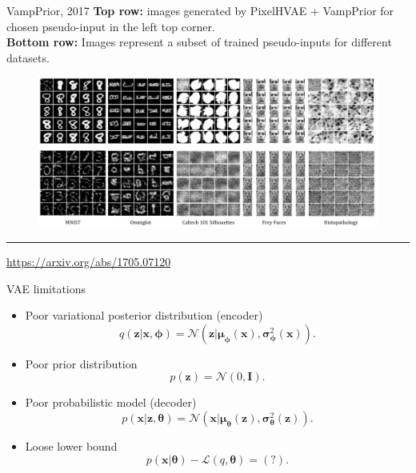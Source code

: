 \documentclass{beamer}
\newcommand{\bx}{\mathbf{x}}
\newcommand{\bz}{\mathbf{z}}
\newcommand{\bmu}{\boldsymbol{\mu}}
\newcommand{\bsigma}{\boldsymbol{\sigma}}
\newcommand{\btheta}{\boldsymbol{\theta}}
\newcommand{\bphi}{\boldsymbol{\phi}}
\begin{document}
\begin{frame}{VampPrior, 2017}
	\vspace{0.1cm}
	\textbf{Top row:} images generated by PixelHVAE + VampPrior for chosen pseudo-input in the left top corner. \\
	\vspace{0.1cm}
	\textbf{Bottom row:} Images represent a subset of trained pseudo-inputs for different datasets.
	\begin{figure}[h]
		\centering
		\includegraphics[width=1.0\linewidth]{figs/VampPrior_4.png}
	\end{figure}
	\vfill
	\hrule\medskip
	{\scriptsize \href{https://arxiv.org/abs/1705.07120}{https://arxiv.org/abs/1705.07120}}
\end{frame}
\begin{frame}{VAE limitations}
\begin{itemize}
	\item Poor variational posterior distribution (encoder)
	\[
	q(\bz | \bx, \bphi) = \mathcal{N}(\bz| \bmu_{\bphi}(\bx), \bsigma^2_{\bphi}(\bx)).
	\]
	\item Poor prior distribution
	\[
	p(\bz) = \mathcal{N}(0, \mathbf{I}).
	\]
	\item Poor probabilistic model (decoder)
	\[
	p(\bx | \bz, \btheta) = \mathcal{N}(\bx| \bmu_{\btheta}(\bz), \bsigma^2_{\btheta}(\bz)).
	\]
	\item Loose lower bound
	\[
	p(\bx | \btheta) - \mathcal{L}(q, \btheta) = (?).
	\]
\end{itemize}
\end{frame}
\end{document}
